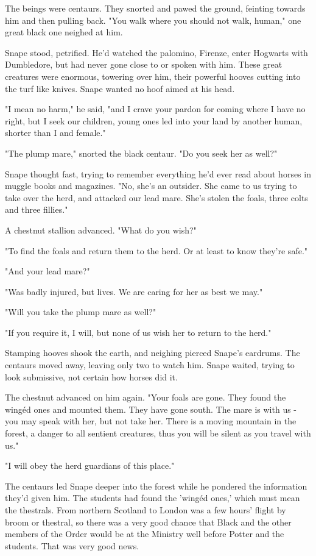 \documentclass[a4paper,11pt]{article}
\begin{document}
The beings were centaurs. They snorted and pawed the ground, feinting towards him and then pulling back. "You walk where you should not walk, human," one great black one neighed at him.

Snape stood, petrified. He'd watched the palomino, Firenze, enter Hogwarts with Dumbledore, but had never gone close to or spoken with him. These great creatures were enormous, towering over him, their powerful hooves cutting into the turf like knives. Snape wanted no hoof aimed at his head.

"I mean no harm," he said, "and I crave your pardon for coming where I have no right, but I seek our children, young ones led into your land by another human, shorter than I and female."

"The plump mare," snorted the black centaur. "Do you seek her as well?"

Snape thought fast, trying to remember everything he'd ever read about horses in muggle books and magazines. "No, she's an outsider. She came to us trying to take over the herd, and attacked our lead mare. She's stolen the foals, three colts and three fillies."

A chestnut stallion advanced. "What do you wish?"

"To find the foals and return them to the herd. Or at least to know they're safe."

"And your lead mare?"

"Was badly injured, but lives. We are caring for her as best we may."

"Will you take the plump mare as well?"

"If you require it, I will, but none of us wish her to return to the herd."

Stamping hooves shook the earth, and neighing pierced Snape's eardrums. The centaurs moved away, leaving only two to watch him. Snape waited, trying to look submissive, not certain how horses did it.

The chestnut advanced on him again. "Your foals are gone. They found the wingéd ones and mounted them. They have gone south. The mare is with us - you may speak with her, but not take her. There is a moving mountain in the forest, a danger to all sentient creatures, thus you will be silent as you travel with us."

"I will obey the herd guardians of this place."

The centaurs led Snape deeper into the forest while he pondered the information they'd given him. The students had found the 'wingéd ones,' which must mean the thestrals. From northern Scotland to London was a few hours' flight by broom or thestral, so there was a very good chance that Black and the other members of the Order would be at the Ministry well before Potter and the students. That was very good news.
\end{document}
